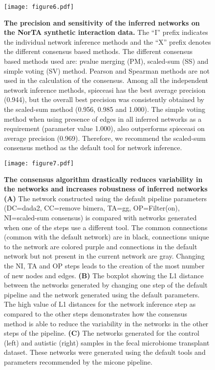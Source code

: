   \begin{figure}[h]
    \centering
    \texttt{[image: figure6.pdf]}
    \caption{
      \textbf{The precision and sensitivity of the inferred networks on the NorTA synthetic interaction data.}
      The ``I'' prefix indicates the individual network inference methods and the ``X'' prefix denotes the different consensus based methods.
      The different consensus based methods used are: pvalue merging (PM), scaled-sum (SS) and simple voting (SV) method.
      Pearson and Spearman methods are not used in the calculation of the consensus.
      Among all the independent network inference methods, \ac{spieceasi} has the best average precision (0.944), but the overall best precision was consistently obtained by the scaled-sum method (0.956, 0.985 and 1.000).
      The simple voting method when using presence of edges in all inferred networks as a requirement (parameter value 1.000), also outperforms \ac{spieceasi} on average precision (0.969).
      Therefore, we recommend the scaled-sum consensus method as the default tool for network inference.
    }
    \label{fig:figure6}
  \end{figure}
  \FloatBarrier
  \newpage

  \begin{figure}[H]
    \centering
    \texttt{[image: figure7.pdf]}
  \end{figure}
  \begin{figure}[H]
    \centering
    \caption{
      \textbf{The consensus algorithm drastically reduces variability in the networks and increases robustness of inferred networks}
      \textbf{(A)} The network constructed using the default pipeline parameters (DC=\ac{dada2}, CC=remove bimera, TA=\ac{gg}, OP=Filter(on), NI=scaled-sum consensus) is compared with networks generated when one of the steps use a different tool.
      The common connections (common with the default network) are in black, connections unique to the network are colored purple and connections in the default network but not present in the current network are gray.
      Changing the NI, TA and OP steps leads to the creation of the most number of new nodes and edges.
      \textbf{(B)} The boxplot showing the L1 distance between the networks generated by changing one step of the default pipeline and the network generated using the default parameters.
      The high value of L1 distances for the network inference step as compared to the other steps demonstrates how the consensus method is able to reduce the variability in the networks in the other steps of the pipeline.
      \textbf{(C)} The networks generated for the control (left) and autistic (right) samples in the fecal microbiome transplant dataset.
      These networks were generated using the default tools and parameters recommended by the \ac{micone} pipeline.
    }
    \label{fig:figure7}
  \end{figure}
